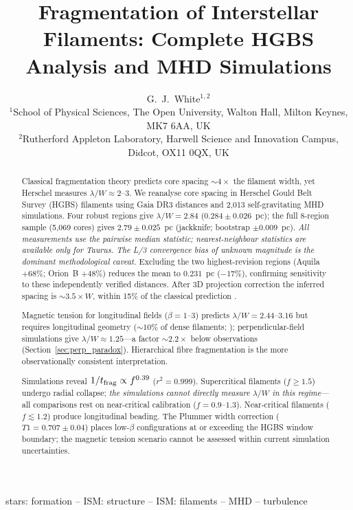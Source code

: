\documentclass[twoside,twocolumn]{mnras}
\title{Fragmentation of Interstellar Filaments: Complete HGBS Analysis and MHD Simulations}
\author[G.~J.~White]{G.~J.~White$^{1,2}$\\
$^{1}$School of Physical Sciences, The Open University, Walton Hall, Milton Keynes, MK7 6AA, UK\\
$^{2}$Rutherford Appleton Laboratory, Harwell Science and Innovation Campus, Didcot, OX11 0QX, UK}
\begin{document}
\maketitle

\begin{abstract}
Classical fragmentation theory predicts core spacing ${\sim}4\times$ the filament
width, yet Herschel measures $\lambda/W \approx 2$--$3$. We reanalyse core spacing
in Herschel Gould Belt Survey (HGBS) filaments using Gaia DR3 distances and 2,013
self-gravitating MHD simulations. Four robust regions give $\lambda/W = 2.84$
($0.284 \pm 0.026$~pc); the full 8-region sample (5,069 cores) gives $2.79 \pm 0.025$~pc
(jackknife; bootstrap $\pm 0.009$~pc). \textit{All measurements use the pairwise median
statistic; nearest-neighbour statistics are available only for Taurus. The L/3 convergence
bias of unknown magnitude is the dominant methodological caveat.} Excluding the two
highest-revision regions (Aquila $+68\%$; Orion~B $+48\%$) reduces the mean to
$0.231$~pc ($-17\%$), confirming sensitivity to these independently verified distances.
After 3D projection correction the inferred spacing is ${\sim}3.5\times W$, within 15\%
of the classical prediction \citep{Inutsuka1992}.

Magnetic tension for longitudinal fields ($\beta = 1$--$3$) predicts
$\lambda/W = 2.44$--$3.16$ but requires longitudinal geometry (${\sim}10\%$ of dense
filaments; \citealt{Planck2016}); perpendicular-field simulations give
$\lambda/W \approx 1.25$---a factor ${\sim}2.2\times$ below observations (Section~\ref{sec:perp_paradox}).
Hierarchical fibre fragmentation is the more observationally consistent interpretation.

Simulations reveal $1/t_{\rm frag} \propto f^{0.39}$ ($r^2 = 0.999$). Supercritical
filaments ($f \geq 1.5$) undergo radial collapse; \textit{the simulations cannot
directly measure $\lambda/W$ in this regime}---all comparisons rest on near-critical
calibration ($f = 0.9$--$1.3$). Near-critical filaments ($f \lesssim 1.2$) produce
longitudinal beading. The Plummer width correction ($T1 = 0.707 \pm 0.04$) places
low-$\beta$ configurations at or exceeding the HGBS window boundary; the magnetic
tension scenario cannot be assessed within current simulation uncertainties.
\end{abstract}

\begin{keywords}
stars: formation -- ISM: structure -- ISM: filaments -- MHD -- turbulence
\end{keywords}
\end{document}
